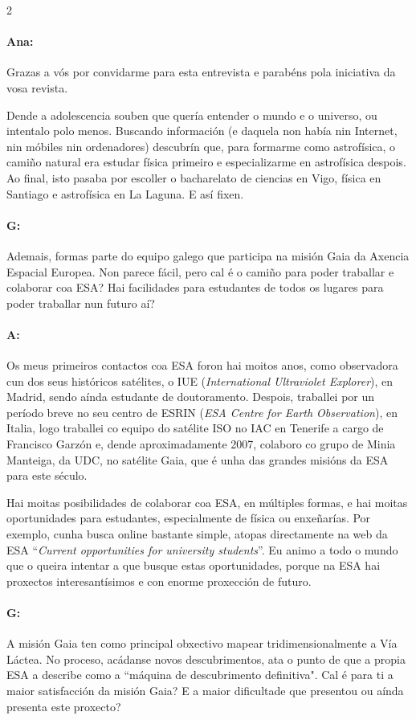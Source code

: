 \begin{multicols}{2}
\paragraph{Ana:} Grazas a vós por convidarme para esta entrevista e parabéns pola
iniciativa da vosa revista.

Dende a adolescencia souben que quería entender o mundo e o universo, ou
intentalo polo menos. Buscando información (e daquela non había nin Internet,
nin móbiles nin ordenadores) descubrín que, para formarme como astrofísica, o
camiño natural era estudar física primeiro e especializarme en astrofísica
despois. Ao final, isto pasaba por escoller o bacharelato de ciencias en Vigo,
física en Santiago e astrofísica en La Laguna. E así fixen.

\paragraph{G:} Ademais, formas parte do equipo galego que participa na misión Gaia
da Axencia Espacial Europea. Non parece fácil, pero cal é o camiño para poder
traballar e colaborar coa ESA? Hai facilidades para estudantes de todos os
lugares para poder traballar nun futuro aí?

\paragraph{A:} Os meus primeiros contactos coa ESA foron hai moitos anos, como
observadora cun dos seus históricos satélites, o IUE (\textit{International
Ultraviolet Explorer}), en Madrid, sendo aínda estudante de doutoramento.
Despois, traballei por un período breve no seu centro de ESRIN (\textit{ESA
Centre for Earth Observation}), en Italia, logo traballei co equipo do satélite
ISO no IAC en Tenerife a cargo de Francisco Garzón e, dende aproximadamente
2007, colaboro co grupo de Minia Manteiga, da UDC, no satélite Gaia, que é unha
das grandes misións da ESA para este século.

Hai moitas posibilidades de colaborar coa ESA, en múltiples formas, e hai
moitas oportunidades para estudantes, especialmente de física ou enxeñarías.
Por exemplo, cunha busca online bastante simple, atopas directamente na web da
ESA  “\textit{Current opportunities for university students}”. Eu animo a todo
o mundo que o queira intentar a que busque estas oportunidades, porque na ESA hai
proxectos interesantísimos e con enorme proxección de futuro.

\paragraph{G:} A misión Gaia ten como principal obxectivo mapear
tridimensionalmente a Vía Láctea. No proceso, acádanse novos descubrimentos,
ata o punto de que a propia ESA a describe como a ``máquina de descubrimento
definitiva". Cal é para ti a maior satisfacción da misión Gaia? E a maior
dificultade que presentou ou aínda presenta este proxecto?


\end{multicols}
